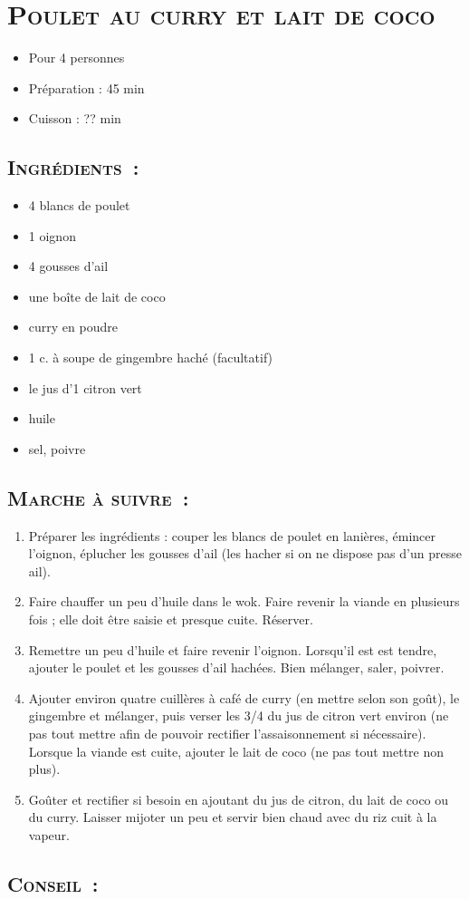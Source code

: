 \section[\normalsize{Poulet au curry et lait de coco}]{\LARGE{\textsc{Poulet au curry et lait de coco}}}		%


\begin{itemize}
\item Pour 4 personnes
\item Préparation : 45 min
\item Cuisson : ?? min
\end{itemize}

\subsection*{\textsc{Ingr\'edients~:}}

\begin{itemize}
\item 4 blancs de poulet 
\item 1 oignon 
\item 4 gousses d'ail
\item une bo\^ite de lait de coco
\item curry en poudre
\item 1 c. \`a soupe de gingembre hach\'e (facultatif)
\item le jus d'1 citron vert
\item huile
\item sel, poivre
\end{itemize}


\subsection*{\textsc{Marche \`a suivre~:}}

\begin{enumerate}
\item Pr\'eparer les ingr\'edients : couper les blancs de poulet en lani\`eres, \'emincer l'oignon, \'eplucher les gousses d'ail (les hacher si on ne dispose pas d'un presse ail).
\item Faire chauffer un peu d'huile dans le wok. Faire revenir la viande en plusieurs fois ; elle doit \^etre saisie et presque cuite. R\'eserver. 
\item Remettre un peu d'huile et faire revenir l'oignon. Lorsqu'il est est tendre, ajouter le poulet et les gousses d'ail hach\'ees. Bien m\'elanger, saler, poivrer.
\item Ajouter environ quatre cuill\`eres \`a caf\'e de curry (en mettre selon son goût), le gingembre et m\'elanger, puis verser les 3/4 du jus de citron vert environ (ne pas tout mettre afin de pouvoir rectifier l'assaisonnement si n\'ecessaire). Lorsque la viande est cuite, ajouter le lait de coco (ne pas tout mettre non 
plus).
\item Goûter et rectifier si besoin en ajoutant du jus de citron, du lait de coco ou du curry. Laisser mijoter un peu et servir bien chaud avec du riz cuit \`a la vapeur.
\end{enumerate}
\subsection*{\textsc{Conseil~:}}

